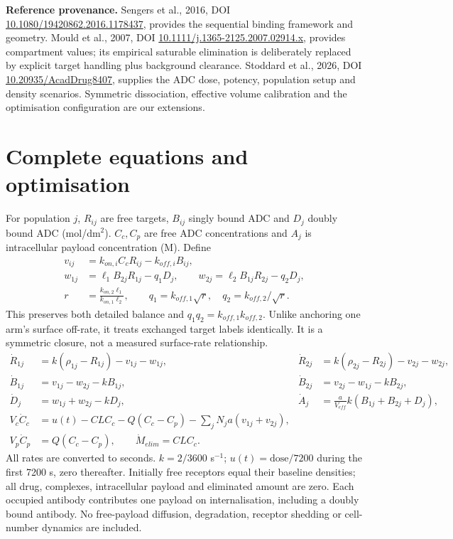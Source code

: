 \documentclass[10pt,a4paper]{article}
\begin{document}
\textbf{Reference provenance.} Sengers et al., 2016, DOI \href{https://doi.org/10.1080/19420862.2016.1178437}{10.1080/19420862.2016.1178437}, provides the sequential binding framework and geometry. Mould et al., 2007, DOI \href{https://doi.org/10.1111/j.1365-2125.2007.02914.x}{10.1111/j.1365-2125.2007.02914.x}, provides compartment values; its empirical saturable elimination is deliberately replaced by explicit target handling plus background clearance. Stoddard et al., 2026, DOI \href{https://doi.org/10.20935/AcadDrug8407}{10.20935/AcadDrug8407}, supplies the ADC dose, potency, population setup and density scenarios. Symmetric dissociation, effective volume calibration and the optimisation configuration are our extensions.
\newpage
\section*{Complete equations and optimisation}
For population $j$, $R_{ij}$ are free targets, $B_{ij}$ singly bound ADC and $D_j$ doubly bound ADC (mol/dm$^2$). $C_c,C_p$ are free ADC concentrations and $A_j$ is intracellular payload concentration (M). Define
\begin{align*}
v_{ij}&=k_{on,i}C_cR_{ij}-k_{off,i}B_{ij},\\
w_{1j}&=\ell_1B_{2j}R_{1j}-q_1D_j,\qquad
w_{2j}=\ell_2B_{1j}R_{2j}-q_2D_j,\\
r&=\frac{k_{on,2}\ell_1}{k_{on,1}\ell_2},\qquad q_1=k_{off,1}\sqrt r,\quad q_2=k_{off,2}/\sqrt r.
\end{align*}
This preserves both detailed balance and $q_1q_2=k_{off,1}k_{off,2}$. Unlike anchoring one arm's surface off-rate, it treats exchanged target labels identically. It is a symmetric closure, not a measured surface-rate relationship.
\begin{align*}
\dot R_{1j}&=k(\rho_{1j}-R_{1j})-v_{1j}-w_{1j},&
\dot R_{2j}&=k(\rho_{2j}-R_{2j})-v_{2j}-w_{2j},\\
\dot B_{1j}&=v_{1j}-w_{2j}-kB_{1j},&
\dot B_{2j}&=v_{2j}-w_{1j}-kB_{2j},\\
\dot D_j&=w_{1j}+w_{2j}-kD_j,&
\dot A_j&=\frac{a}{V_{eff}}k(B_{1j}+B_{2j}+D_j),\\
V_c\dot C_c&=u(t)-CL C_c-Q(C_c-C_p)-\sum_jN_ja(v_{1j}+v_{2j}),\\
V_p\dot C_p&=Q(C_c-C_p),\qquad \dot M_{elim}=CL C_c.
\end{align*}
All rates are converted to seconds. $k=2/3600$ s$^{-1}$; $u(t)=\mathrm{dose}/7200$ during the first 7200 s, zero thereafter. Initially free receptors equal their baseline densities; all drug, complexes, intracellular payload and eliminated amount are zero. Each occupied antibody contributes one payload on internalisation, including a doubly bound antibody. No free-payload diffusion, degradation, receptor shedding or cell-number dynamics are included.
\end{document}
